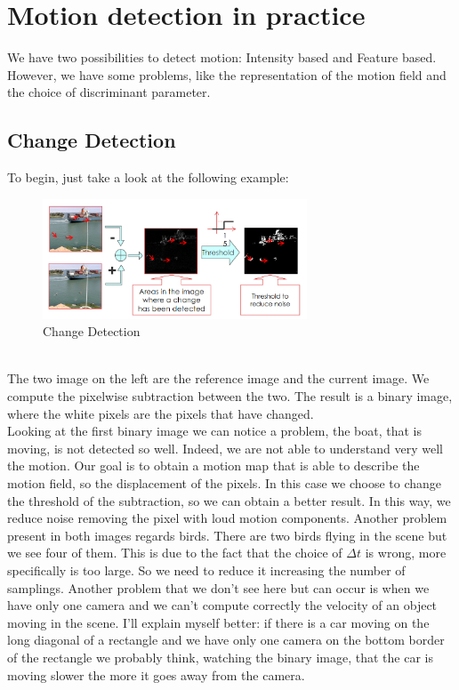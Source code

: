\section{Motion detection in practice}
We have two possibilities to detect motion: Intensity based and Feature based. However, we have some problems, like the representation of the motion field and the choice of discriminant parameter.
\subsection{Change Detection}
To begin, just take a look at the following example:
\begin{figure}[h]
    \centering
    \includegraphics[width=0.7\textwidth]{Figures/ChangeDetection.png}
    \caption{Change Detection}
\end{figure}
\\The two image on the left are the reference image and the current image. We compute the pixelwise subtraction between the two. The result is a binary image, where the white pixels are the pixels that have changed.
\\Looking at the first binary image we can notice a problem, the boat, that is moving, is not detected so well. Indeed, we are not able to understand very well the motion. Our goal is to obtain a motion map that is able to describe the motion field, so the displacement of the pixels.
In this case we choose to change the threshold of the subtraction, so we can obtain a better result. In this way, we reduce noise removing the pixel with loud motion components. Another problem present in both images regards birds. There are two birds flying in the scene but we see four of them. This is due to the fact that the choice of $\Delta t$ is wrong, more specifically is too large. So we need to reduce it increasing the number of samplings.
Another problem that we don't see here but can occur is when we have only one camera and we can't compute correctly the velocity of an object moving in the scene. I'll explain myself better: if there is a car moving on the long diagonal of a rectangle and we have only one camera on the bottom border of the rectangle we probably think, watching the binary image, that the car is moving slower the more it goes away from the camera. 
